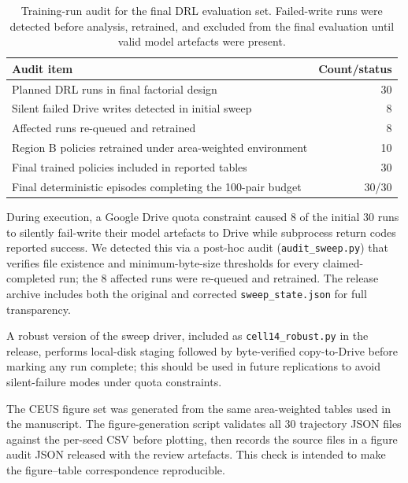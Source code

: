 \documentclass[]{interact}
\theoremstyle{plain}
\begin{document}
\begin{table}[htbp]
\centering
\caption{Training-run audit for the final DRL evaluation set. Failed-write runs were detected before analysis, retrained, and excluded from the final evaluation until valid model artefacts were present.}
\label{tab:compute-audit}
\small
\begin{tabular}{@{}p{}r@{}}
\toprule
Audit item & Count/status \\
\midrule
Planned DRL runs in final factorial design & 30 \\
Silent failed Drive writes detected in initial sweep & 8 \\
Affected runs re-queued and retrained & 8 \\
Region B policies retrained under area-weighted environment & 10 \\
Final trained policies included in reported tables & 30 \\
Final deterministic episodes completing the 100-pair budget & 30/30 \\
\bottomrule
\end{tabular}
\end{table}

During execution, a Google Drive quota constraint caused 8 of the initial 30 runs to silently fail-write their model artefacts to Drive while subprocess return codes reported success. We detected this via a post-hoc audit (\texttt{audit\_sweep.py}) that verifies file existence and minimum-byte-size thresholds for every claimed-completed run; the 8 affected runs were re-queued and retrained. The release archive includes both the original and corrected \texttt{sweep\_state.json} for full transparency.

A robust version of the sweep driver, included as \texttt{cell14\_robust.py} in the release, performs local-disk staging followed by byte-verified copy-to-Drive before marking any run complete; this should be used in future replications to avoid silent-failure modes under quota constraints.

The CEUS figure set was generated from the same area-weighted tables used in the manuscript. The figure-generation script validates all 30 trajectory JSON files against the per-seed CSV before plotting, then records the source files in a figure audit JSON released with the review artefacts. This check is intended to make the figure--table correspondence reproducible.

\clearpage
\end{document}
